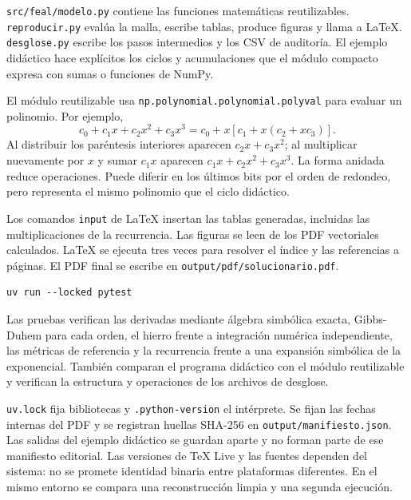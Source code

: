 

\texttt{src/feal/modelo.py} contiene las funciones matemáticas reutilizables. \texttt{reproducir.py} evalúa la malla, escribe tablas, produce figuras y llama a LaTeX. \texttt{desglose.py} escribe los pasos intermedios y los CSV de auditoría. El ejemplo didáctico hace explícitos los ciclos y acumulaciones que el módulo compacto expresa con sumas o funciones de NumPy.

El módulo reutilizable usa \texttt{np.polynomial.polynomial.polyval} para evaluar un polinomio. Por ejemplo,
\[
c_0+c_1x+c_2x^2+c_3x^3
=c_0+x[c_1+x(c_2+xc_3)].
\]
Al distribuir los paréntesis interiores aparecen $c_2x+c_3x^2$; al multiplicar nuevamente por $x$ y sumar $c_1x$ aparecen $c_1x+c_2x^2+c_3x^3$. La forma anidada reduce operaciones. Puede diferir en los últimos bits por el orden de redondeo, pero representa el mismo polinomio que el ciclo didáctico.

Los comandos \texttt{input} de LaTeX insertan las tablas generadas, incluidas las multiplicaciones de la recurrencia. Las figuras se leen de los PDF vectoriales calculados. LaTeX se ejecuta tres veces para resolver el índice y las referencias a páginas. El PDF final se escribe en \texttt{output/pdf/solucionario.pdf}.

\begin{verbatim}
uv run --locked pytest
\end{verbatim}
Las pruebas verifican las derivadas mediante álgebra simbólica exacta, Gibbs-Duhem para cada orden, el hierro frente a integración numérica independiente, las métricas de referencia y la recurrencia frente a una expansión simbólica de la exponencial. También comparan el programa didáctico con el módulo reutilizable y verifican la estructura y operaciones de los archivos de desglose.

\texttt{uv.lock} fija bibliotecas y \texttt{.python-version} el intérprete. Se fijan las fechas internas del PDF y se registran huellas SHA-256 en \texttt{output/manifiesto.json}. Las salidas del ejemplo didáctico se guardan aparte y no forman parte de ese manifiesto editorial. Las versiones de TeX Live y las fuentes dependen del sistema: no se promete identidad binaria entre plataformas diferentes. En el mismo entorno se compara una reconstrucción limpia y una segunda ejecución.

